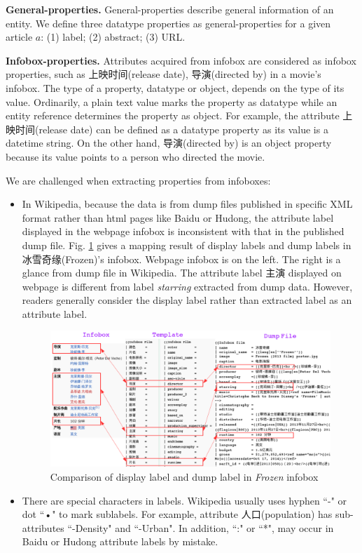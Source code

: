 \documentclass[runningheads,a4paper]{llncs}
\newcommand{\para}[1]{\vspace{0.1cm}\noindent\textbf{#1}}
\begin{document}
\para{General-properties.} %
General-properties describe general information of an entity. We define three datatype properties as general-properties for a given article $a$: (1) label; (2) abstract; (3) URL.

\para{Infobox-properties.} Attributes acquired from infobox are considered as infobox properties, such as 上映时间(release date), 导演(directed by) in a movie's infobox. The type of a property, datatype or object, depends on the type of its value. Ordinarily, a plain text value marks the property as datatype while an entity reference determines the property as object. For example, the attribute 上映时间(release date) can be defined as a datatype property as its value is a datetime string. On the other hand, 导演(directed by) is an object property because its value points to a person who directed the movie.

We are challenged when extracting properties from infoboxes:
\begin{itemize}
    \item In Wikipedia, because the data is from dump files published in specific XML format rather than html pages like Baidu or Hudong, the attribute label displayed in the webpage infobox is inconsistent with that in the published dump file. Fig. \ref{fig:infobox-template} gives a mapping result of display labels and dump labels in 冰雪奇缘(Frozen)'s infobox. Webpage infobox is on the left. The right is a glance from dump file in Wikipedia. The attribute label 主演 displayed on webpage is different from label \emph{starring} extracted from dump data. However, readers generally consider the display label rather than extracted label as an attribute label.
    \begin{figure}[ht]
        \centerline{\includegraphics[width=1\columnwidth]{fig/infobox-template3}}
        \caption{Comparison of display label and dump label in \emph{Frozen} infobox}
        \label{fig:infobox-template}
    \end{figure}%
    \item There are special characters in labels. Wikipedia usually uses hyphen ``-" or dot ``•" to mark sublabels. For example, attribute 人口(population) has sub-attributes ``-Density" and ``-Urban". In addition, ``:" or ``*", may occur in Baidu or Hudong attribute labels by mistake.
\end{itemize}
\end{document}
